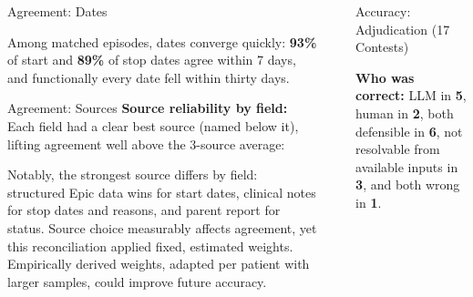 \documentclass[final]{beamer}
\newlength{\sepwidth}
\newlength{\colnarrow}  %
\newcommand{\separatorcolumn}{\begin{column}{\sepwidth}\end{column}}
\begin{document}
\begin{frame}[t]
\begin{columns}[t]
\begin{column}{\colnarrow}
  \begin{block}{Agreement: Dates}
   \vspace{0.8cm}
    \begin{center}

    \end{center}
    \vspace{0.4em}
    Among matched episodes, dates converge quickly: \textbf{93\%} of start and
    \textbf{89\%} of stop dates agree within 7 days, and functionally every date
    fell within thirty days.
  \end{block}

  \begin{block}{Agreement: Sources}
  \vspace{0.8em}
\textbf{Source reliability by field:} Each field had a clear best source (named
below it), lifting agreement well above the 3-source average:
    \begin{center}
    \vspace{-0.2cm}
    
    \end{center}
    \vspace{0.6cm}
Notably, the strongest source differs by field: structured Epic data wins for
start dates, clinical notes for stop dates and reasons, and parent report for
status. Source choice measurably affects agreement, yet this reconciliation
applied fixed, estimated weights. Empirically derived weights, adapted per
patient with larger samples, could improve future accuracy.
\end{block}

\end{column}

\separatorcolumn

\begin{column}{\colnarrow}   %

 \begin{block}{Accuracy: Adjudication (17 Contests)}
  \vspace{-0.4em}
  \begin{center}
    
  \end{center}
\textbf{Who was correct:} LLM in \textbf{5}, human in \textbf{2}, both defensible
in \textbf{6}, not resolvable from available inputs in \textbf{3}, and both
wrong in \textbf{1}.


\end{block}
\end{column}
\end{columns}
\end{frame}
\end{document}
